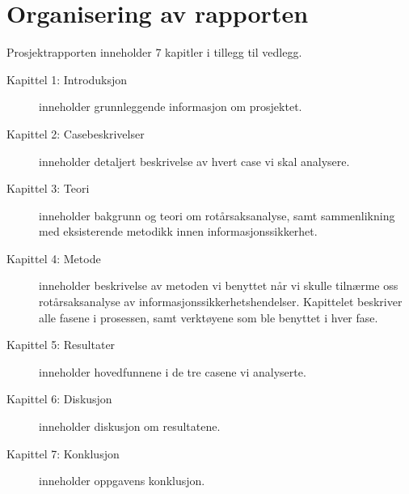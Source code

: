 \section{Organisering av rapporten}
\label{sec:organisering_rapport}
Prosjektrapporten inneholder 7 kapitler i tillegg til vedlegg.


\begin{description}
    \item [Kapittel 1: Introduksjon] inneholder grunnleggende informasjon om prosjektet.
    \item [Kapittel 2: Casebeskrivelser] inneholder detaljert beskrivelse av hvert case vi skal analysere.
    \item [Kapittel 3: Teori] inneholder bakgrunn og teori om rotårsaksanalyse, samt sammenlikning med eksisterende metodikk innen informasjonssikkerhet.
    \item [Kapittel 4: Metode] inneholder beskrivelse av metoden vi benyttet når vi skulle tilnærme oss rotårsaksanalyse av informasjonssikkerhetshendelser. Kapittelet beskriver alle fasene i prosessen, samt verktøyene som ble benyttet i hver fase. 
    \item [Kapittel 5: Resultater] inneholder hovedfunnene i de tre casene vi analyserte.
    \item [Kapittel 6: Diskusjon] inneholder diskusjon om resultatene.
    \item [Kapittel 7: Konklusjon] inneholder oppgavens konklusjon.
\end{description}